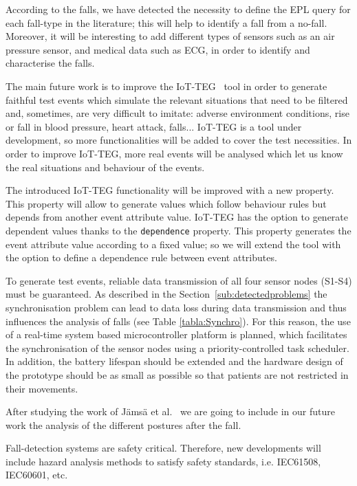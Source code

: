 \documentclass[review]{elsarticle}
\begin{document}
According to the falls, we have detected the necessity to define the
EPL query for each fall-type in the literature; this will
help to identify a fall from a no-fall. Moreover, it will be
interesting to add different types of sensors such as an air 
pressure sensor, and medical data such as ECG, in order to identify and characterise the falls.

The main future work is to improve the IoT-TEG~\cite{TesisGutierrez2017,Gutierrez2017} tool in order to generate faithful 
test events which simulate the 
relevant situations that need to be filtered and, sometimes, are very difficult to imitate: adverse environment conditions, 
rise or fall in blood pressure, heart attack, falls... IoT-TEG is a
tool under development, so more functionalities will be added
to cover the test necessities. In order to improve IoT-TEG, more real events will be analysed which let us know 
the real situations and behaviour of the events.

The introduced IoT-TEG functionality will be improved with a new property. This property will allow to generate values 
which follow behaviour rules but depends from another event attribute value. IoT-TEG has the option
to generate dependent values thanks to the \texttt{dependence} property. This property generates the event attribute value 
according to a fixed value; so we will extend the tool with the option to define a dependence rule between event attributes. 

To generate test events, reliable data transmission of all four sensor nodes (S1-S4) must be guaranteed. As described in 
the Section~\ref{sub:detectedproblems} the synchronisation problem can
lead to data loss during data transmission and  
thus influences the analysis of falls (see Table
\ref{tabla:Synchro}). For this reason, the use of a real-time system  
based microcontroller platform is planned, which facilitates the
synchronisation of the sensor nodes using a  
priority-controlled task scheduler. In addition, the battery lifespan
should be extended and the hardware design of the  
prototype should be as small as possible so that patients are not
restricted in their movements.

After studying the work of J{\"a}ms{\"a} et al.~\cite{jamsa2014fall}
we are going to include in our future work the analysis of 
the different postures after the fall. 

Fall-detection systems are safety critical. Therefore, new developments will include hazard analysis methods
to satisfy safety standards, i.e. IEC61508, IEC60601, etc.
\end{document}
